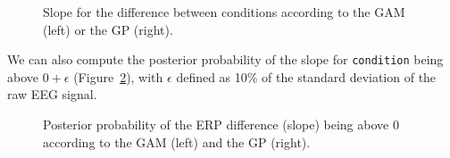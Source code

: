 \documentclass[
  doc,
  floatsintext,
  longtable,
  a4paper,
  nolmodern,
  notxfonts,
  notimes,
  colorlinks=true,linkcolor=blue,citecolor=blue,urlcolor=blue]{apa7}
\begin{document}
\begin{figure}[!htb]

\caption{\label{fig-plot-post-slope}Slope for the difference between
conditions according to the GAM (left) or the GP (right).}


\end{figure}%

We can also compute the posterior probability of the slope for
\texttt{condition} being above \(0+\epsilon\)
(Figure~\ref{fig-post-prob-test}), with \(\epsilon\) defined as 10\% of
the standard deviation of the raw EEG signal.

\begin{figure}[!htb]

\caption{\label{fig-post-prob-test}Posterior probability of the ERP
difference (slope) being above 0 according to the GAM (left) and the GP
(right).}


\end{figure}%
\end{document}
